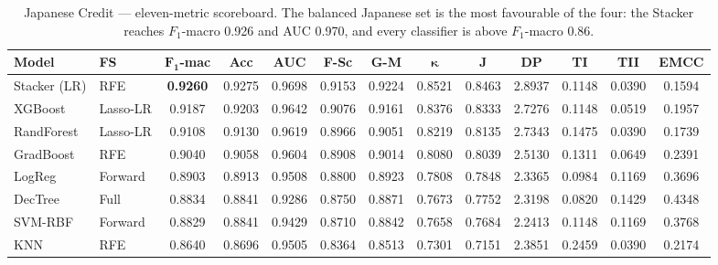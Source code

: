 \begin{table}[H]
\centering
\caption{Japanese Credit --- eleven-metric scoreboard. The balanced
Japanese set is the most favourable of the four: the Stacker reaches
$F_1$-macro 0.926 and AUC 0.970, and every classifier is above
$F_1$-macro 0.86.}
\singlespacing
\label{tab:11m-jap}
\scriptsize
\setlength{\tabcolsep}{3.5pt}
\renewcommand{\arraystretch}{1.15}
\begin{tabular}{l l c c c c c c c c c c c}
\toprule
\textbf{Model} & \textbf{FS} & $\boldsymbol{F_1}$\textbf{-mac} & \textbf{Acc} & \textbf{AUC} & \textbf{F-Sc} & \textbf{G-M} & $\boldsymbol{\kappa}$ & \textbf{J} & \textbf{DP} & \textbf{TI} & \textbf{TII} & \textbf{EMCC}\\
\midrule
Stacker (LR) & RFE      & \textbf{0.9260} & 0.9275 & 0.9698 & 0.9153 & 0.9224 & 0.8521 & 0.8463 & 2.8937 & 0.1148 & 0.0390 & 0.1594\\
XGBoost      & Lasso-LR & 0.9187 & 0.9203 & 0.9642 & 0.9076 & 0.9161 & 0.8376 & 0.8333 & 2.7276 & 0.1148 & 0.0519 & 0.1957\\
RandForest   & Lasso-LR & 0.9108 & 0.9130 & 0.9619 & 0.8966 & 0.9051 & 0.8219 & 0.8135 & 2.7343 & 0.1475 & 0.0390 & 0.1739\\
GradBoost    & RFE      & 0.9040 & 0.9058 & 0.9604 & 0.8908 & 0.9014 & 0.8080 & 0.8039 & 2.5130 & 0.1311 & 0.0649 & 0.2391\\
LogReg       & Forward  & 0.8903 & 0.8913 & 0.9508 & 0.8800 & 0.8923 & 0.7808 & 0.7848 & 2.3365 & 0.0984 & 0.1169 & 0.3696\\
DecTree      & Full     & 0.8834 & 0.8841 & 0.9286 & 0.8750 & 0.8871 & 0.7673 & 0.7752 & 2.3198 & 0.0820 & 0.1429 & 0.4348\\
SVM-RBF      & Forward  & 0.8829 & 0.8841 & 0.9429 & 0.8710 & 0.8842 & 0.7658 & 0.7684 & 2.2413 & 0.1148 & 0.1169 & 0.3768\\
KNN          & RFE      & 0.8640 & 0.8696 & 0.9505 & 0.8364 & 0.8513 & 0.7301 & 0.7151 & 2.3851 & 0.2459 & 0.0390 & 0.2174\\
\bottomrule
\end{tabular}
\end{table}

